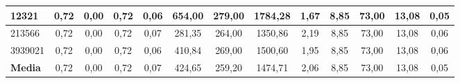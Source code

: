 \documentclass[12pt, spanish]{article}
\begin{document}
\begin{table}[H]
\begin{adjustwidth}{-1cm}{-1cm}
\begin{tabular}{|l|c|c|c|c|c|c|c|c|c|c|c|c|}
12321                                                   & 0,72                         & 0,00                           & 0,72                      & 0,06                   & 654,00                       & 279,00                         & 1784,28                   & 1,67                   & 8,85                         & 73,00                          & 13,08                     & 0,05                   \\ \hline
213566                                                  & 0,72                         & 0,00                           & 0,72                      & 0,07                   & 281,35                       & 264,00                         & 1350,86                   & 2,19                   & 8,85                         & 73,00                          & 13,08                     & 0,06                   \\ \hline
3939021                                                 & 0,72                         & 0,00                           & 0,72                      & 0,06                   & 410,84                       & 269,00                         & 1500,60                   & 1,95                   & 8,85                         & 73,00                          & 13,08                     & 0,06                   \\ \hline
\textbf{Media}                                          & 0,72                         & 0,00                           & 0,72                      & 0,07                   & 424,65                       & 259,20                         & 1474,71                   & 2,06                   & 8,85                         & 73,00                          & 13,08                     & 0,05                   \\ \hline
\end{tabular}
\end{adjustwidth}

\end{table}
\end{document}
